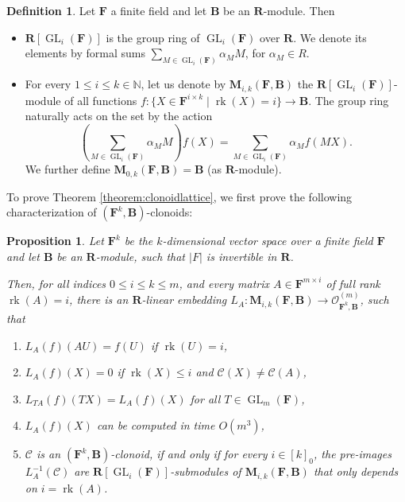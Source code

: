 \documentclass[11pt]{amsart}
\theoremstyle{plain}
\newtheorem{proposition}[thm]{Proposition}
\theoremstyle{definition}
\newtheorem{definition}[thm]{Definition}
\newcommand{\N}{{\mathbb N}}
\newcommand{\F}{{\mathbf F}}
\newcommand{\alg}[1]{\mathbf{#1}}
\newcommand{\clone}[1]{\mathcal{#1}}
\newcommand{\clonoid}[1]{\mathcal{#1}}
\newcommand{\clodC}{\clonoid{C}}
\newcommand{\clodO}{\clonoid{O}}
\newcommand{\algB}{\alg{B}}
\newcommand{\algM}{\alg{M}}
\newcommand{\algR}{\alg{R}}
\newcommand{\cloC}{\clone{C}}
\DeclareMathOperator{\rk}{rk}
\DeclareMathOperator{\GL}{GL}
\newcommand{\Col}[1]{\mathcal{C}(#1)}
\begin{document}
\begin{definition}
Let $\F$ a finite field and let $\algB$ be an $\algR$-module. Then 
\begin{itemize}
\item $\algR[\GL_i(\F)]$ is the group ring of $\GL_i(\F)$ over $\algR$. We denote its elements by formal sums $\sum_{M \in \GL_i(\F)} \alpha_M M$, for $\alpha_M \in R$.
\item For every $1 \leq i \leq k \in \N$, let us denote by $\algM_{i,k}(\F,\algB)$ the $\algR[\GL_i(\F)]$-module of all functions $f\colon \{X \in \F^{i \times k} \mid \rk(X) = i\} \to \algB$. The group ring naturally acts on the set by the action $$(\sum_{M \in \GL_i(\F)} \alpha_M M)f(X) = \sum_{M \in \GL_i(\F)} \alpha_M f(MX).$$
We further define $\algM_{0,k}(\F,\algB) = \algB$ (as $\algR$-module).
\end{itemize}
\end{definition}

To prove Theorem \ref{theorem:clonoidlattice},  we first prove the following characterization of $(\F^k,\algB)$-clonoids:

\begin{proposition} \label{proposition:grouprings}
Let $\F^k$ be the $k$-dimensional vector space over a finite field $\F$ and let $\algB$ be an $\algR$-module, such that $|F|$ is invertible in $\algR$.

Then, for all indices $0 \leq i\leq k \leq m$, and every matrix $A \in \F^{m \times i}$ of full rank $\rk(A) = i$, there is an $\algR$-linear embedding $L_A \colon \algM_{i,k}(\F,\algB) \to \clodO_{\F^k,\algB}^{(m)}$, such that 
\begin{enumerate}
\item $L_A(f)(AU) = f(U)$ if $\rk(U) = i$,
\item $L_A(f)(X) = 0$ if $\rk(X) \leq i$ and $\Col{X} \neq \Col{A}$,
\item $L_{TA}(f)(TX) = L_A(f)(X)$ for all $T \in \GL_m(\F)$,
\item $L_A(f)(X)$ can be computed in time $O(m^3)$,
\item $\clodC$ is an $(\F^k,\algB)$-clonoid, if and only if for every $i \in [k]_0$, the pre-images $L_A^{-1}(\cloC)$ are $\algR[\GL_i(\F)]$-submodules of $\algM_{i,k}(\F,\algB)$ that only depends on $i=\rk(A)$.
\end{enumerate}
\end{proposition}
\end{document}
